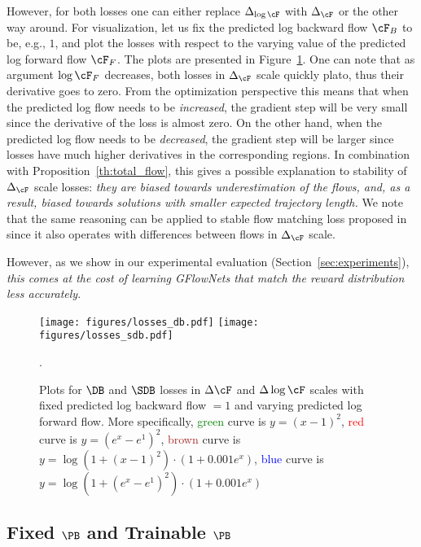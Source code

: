 However, for both losses one can either replace $\Delta_{\log \cF}$ with $\Delta_{\cF}$ or the other way around. For visualization, let us fix the predicted log backward flow $\cF_B$ to be, e.g., $1$, and plot the losses with respect to the varying value of the predicted log forward flow $\cF_F$. The plots are presented in Figure~\ref{fig:losses}. One can note that as argument $\log \cF_F$ decreases, both losses in $\Delta_{\cF}$ scale quickly plato, thus their derivative goes to zero. From the optimization perspective this means that when the predicted log flow needs to be \textit{increased}, the gradient step will be very small since the derivative of the loss is almost zero. On the other hand, when the predicted log flow needs to be \textit{decreased}, the gradient step will be larger since losses have much higher derivatives in the corresponding regions. In combination with Proposition~\ref{th:total_flow}, this gives a possible explanation to stability of $\Delta_{\cF}$ scale losses: \textit{they are biased towards underestimation of the flows, and, as a result, biased towards solutions with smaller expected trajectory length.} We note that the same reasoning can be applied to stable flow matching loss proposed in~\cite{brunswic2024theory} since it also operates with differences between flows in $\Delta_{\cF}$ scale.

However, as we show in our experimental evaluation (Section~\ref{sec:experiments}), \textit{this comes at the cost of learning GFlowNets that match the reward distribution less accurately}.


\begin{figure}[t!]
    \centering
    \texttt{[image: figures/losses\_db.pdf]}
    \texttt{[image: figures/losses\_sdb.pdf]}
    \caption{Plots for $\DB$ and $\SDB$ losses in $\Delta \cF$ and $\Delta \log \cF$ scales with fixed predicted log backward flow $= 1$ and varying predicted log forward flow. More specifically, \textcolor{Green}{green} curve is $y = (x - 1)^2$, \textcolor{red}{red} curve is $y = \left(e^x - e^1\right)^2$, \textcolor{Brown}{brown} curve is $y = \log\left( 1+ (x - 1)^2 \right) \cdot (1 + 0.001e^x)$, \textcolor{blue}{blue} curve is $y = \log\left( 1+ \left(e^x - e^1\right)^2 \right) \cdot (1 + 0.001e^x)$}.  
    \label{fig:losses}
\end{figure}

\subsection{Fixed $\PB$ and Trainable $\PB$}\label{app:fix_and_learn_pb}

